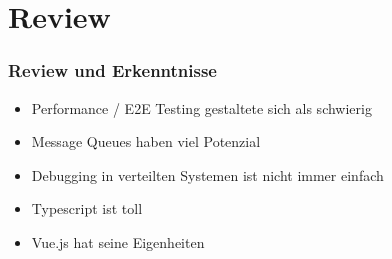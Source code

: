 
\section{Review}
\begin{frame}
    \frametitle{Review und Erkenntnisse}
    \begin{itemize}
        \item Performance / E2E Testing gestaltete sich als schwierig
        \item Message Queues haben viel Potenzial
        \item Debugging in verteilten Systemen ist nicht immer einfach
        \item Typescript ist toll
        \item Vue.js hat seine Eigenheiten
    \end{itemize}
\end{frame}
